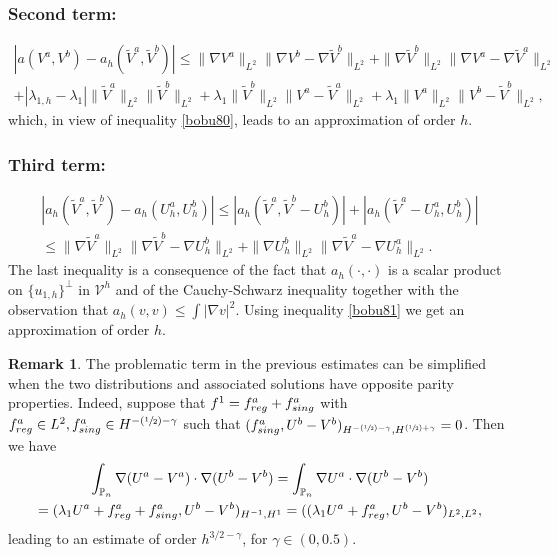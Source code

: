 \documentclass[11pt]{article}
\newcommand{\Subsubsection}{\subsubsection}
\numberwithin{equation}{section}\newtheorem*{jepEnonce}{\jepEnonceTitle}\newenvironment{enonce*}[1]{\def\jepEnonceTitle{#1}\jepEnonce}{\endjepEnonce}\newtheorem*{conj*}{Conjecture}
\newcommand{\Psfrac}[2]{(\sfrac{#1}{#2})}
\theoremstyle{plain}
\theoremstyle{definition}
\newtheorem{rem}[thm]{Remark}
\newcommand{\aaa}{a}
\newcommand{\bbb}{b}
\newcommand{\reg}{\textup{reg}}
\newcommand{\sing}{\textup{sing}}
\def\Pp{{\mathbb{P}_n}}
\newcommand{\lb}{\lambda}
\let\jepOriginalSfrac\sfrac
\renewcommand{\sfrac}[2]{{\jepOriginalSfrac{#1}{#2}}}
\begin{document}
\Subsubsection*{Second term:}\vspace*{-1.8\baselineskip}
\begin{multline*}
|a(V^\aaa,V^\bbb)-a_h(\tilde V^\aaa, \tilde V^\bbb)| \le \|\nabla V^\aaa\|_{L^2} \|\nabla V^\bbb-\nabla \tilde V^\bbb\|_{L^2}+ \|\nabla \tilde V^\bbb\|_{L^2} \|\nabla V^\aaa-\nabla \tilde V^\aaa\|_{L^2}\\
+
|\lb_{1,h}-\lb_1| \|\tilde V^\aaa\|_{L^2}\|\tilde V^\bbb\|_{L^2}+ \lb_1 \|\tilde V^\bbb\|_{L^2} \| V^\aaa- \tilde V^\aaa\|_{L^2}+\lb_1 \|V^\aaa\|_{L^2} \| V^\bbb-\tilde V^\bbb\|_{L^2},
\end{multline*}
which, in view of inequality \eqref{bobu80}, leads to an approximation of order $h$.

\Subsubsection*{Third term:}\vspace*{-1.5\baselineskip}
\begin{multline*}
|a_h(\tilde V^\aaa, \tilde V^\bbb)-a_h(U_h^\aaa, U_h^\bbb)|\le |a_h(\tilde V^\aaa, \tilde V^\bbb-U^\bbb_h)|+ |a_h(\tilde V^\aaa-U^\aaa_h, U_h^\bbb)|\\
\le
\|\nabla \tilde V^\aaa\|_{L^2} \|\nabla \tilde V^\bbb-\nabla U^\bbb_h\|_{L^2}+ \|\nabla U^\bbb_h\|_{L^2} \|\nabla \tilde V^\aaa-\nabla U^\aaa_h\|_{L^2}.
\end{multline*}
The last inequality is a consequence of the fact that $a_h(\cdot, \cdot)$ is a scalar product on $\{u_{1,h}\}^\perp$ in ${\mathcal V}^h$ and of the Cauchy-Schwarz inequality together with the observation that $a_h(v,v) \le \int |\nabla v|^2$.
Using inequality \eqref{bobu81} we get an approximation of order $h$.

\begin{rem}
The problematic term in the previous estimates can be simplified when the two distributions and associated solutions have opposite parity properties. Indeed, suppose that $f^1 = f^\aaa_{\reg}+f^\aaa_{\sing}$ with $f^\aaa_{\reg} \in L^2, f^\aaa_{\sing} \in H^{-\Psfrac{1}{2}-\gamma}$ such that $(f^\aaa_{\sing},U^\bbb-V^\bbb)_{H^{-\Psfrac{1}{2}-\gamma},H^{\Psfrac{1}{2}+\gamma}} = 0$. Then we have
\vspace*{-5pt}
\begin{multline*}
\int_\Pp \nabla (U^\aaa-V^\aaa)\cdot \nabla (U^\bbb-V^\bbb) = \int_\Pp \nabla U^\aaa \cdot \nabla (U^\bbb-V^\bbb) \\
=  (\lambda_1U^\aaa+f^\aaa_{\reg}+f^\aaa_{\sing},U^\bbb-V^\bbb)_{H^{-1},H^1} = ((\lambda_1U^\aaa+f^\aaa_{\reg},U^\bbb-V^\bbb)_{L^2,L^2},
\end{multline*}
leading to an estimate of order $h^{3/2-\gamma}$, for $\gamma \in (0,0.5)$.
\label{rem:zero-singular-part}
\end{rem}
\end{document}
